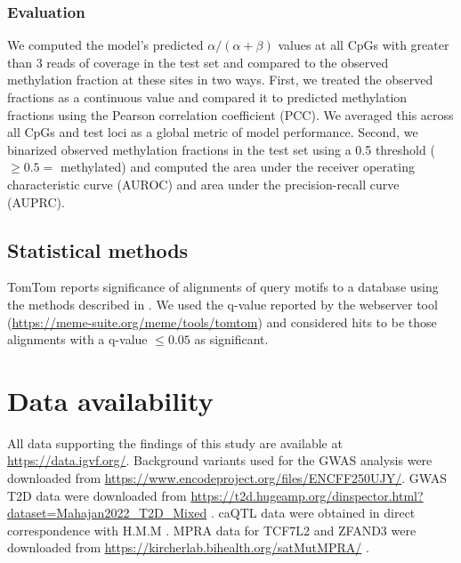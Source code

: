 \subsubsection{Evaluation}

We computed the model's predicted \(\alpha / (\alpha + \beta)\) values at all CpGs with greater than 3 reads of coverage in the test set and compared to the observed methylation fraction at these sites in two ways. First, we treated the observed fractions as a continuous value and compared it to predicted methylation fractions using the Pearson correlation coefficient (PCC). We averaged this across all CpGs and test loci as a global metric of model performance. Second, we binarized observed methylation fractions in the test set using a 0.5 threshold (\(\geq 0.5 =\) methylated) and computed the area under the receiver operating characteristic curve (AUROC) and area under the precision-recall curve (AUPRC).

\subsection{Statistical methods}

TomTom reports significance of alignments of query motifs to a database using the methods described in \cite{Gupta2007-zw}. We used the q-value reported by the webserver tool (\url{https://meme-suite.org/meme/tools/tomtom}) and considered hits to be those alignments with a q-value \(\leq 0.05\) as significant.

\section{Data availability}

All data supporting the findings of this study are available at \url{https://data.igvf.org/}. Background variants used for the GWAS analysis were downloaded from \url{https://www.encodeproject.org/files/ENCFF250UJY/}. GWAS T2D data were downloaded from \url{https://t2d.hugeamp.org/dinspector.html?dataset=Mahajan2022_T2D_Mixed} \cite{Mahajan2022-hu}. caQTL data were obtained in direct correspondence with H.M.M \cite{Mummey2024-kx}. MPRA data for TCF7L2 and ZFAND3 were downloaded from \url{https://kircherlab.bihealth.org/satMutMPRA/} \cite{Kircher2019-di}.

